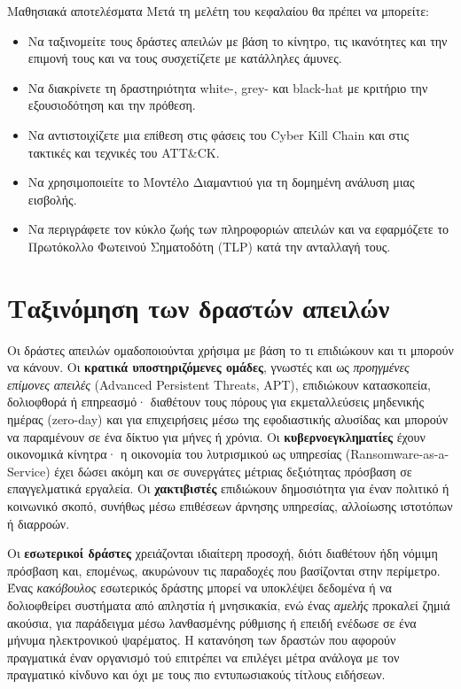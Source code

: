 \documentclass[11pt,openany]{book}
\begin{document}
\begin{outcomesbox}{Μαθησιακά αποτελέσματα}
Μετά τη μελέτη του κεφαλαίου θα πρέπει να μπορείτε:
\begin{itemize}
  \item Να ταξινομείτε τους δράστες απειλών με βάση το κίνητρο, τις ικανότητες και την επιμονή τους και να τους συσχετίζετε με κατάλληλες άμυνες.
  \item Να διακρίνετε τη δραστηριότητα white-, grey- και black-hat με κριτήριο την εξουσιοδότηση και την πρόθεση.
  \item Να αντιστοιχίζετε μια επίθεση στις φάσεις του Cyber Kill Chain και στις τακτικές και τεχνικές του ATT\&CK.
  \item Να χρησιμοποιείτε το Μοντέλο Διαμαντιού για τη δομημένη ανάλυση μιας εισβολής.
  \item Να περιγράφετε τον κύκλο ζωής των πληροφοριών απειλών και να εφαρμόζετε το Πρωτόκολλο Φωτεινού Σηματοδότη (TLP) κατά την ανταλλαγή τους.
\end{itemize}
\end{outcomesbox}

\section{Ταξινόμηση των δραστών απειλών}\label{sec:3.1}
Οι δράστες απειλών ομαδοποιούνται χρήσιμα με βάση το τι επιδιώκουν και τι μπορούν να κάνουν. Οι \textbf{κρατικά υποστηριζόμενες ομάδες}, γνωστές και ως \emph{προηγμένες επίμονες απειλές} (Advanced Persistent Threats, APT), επιδιώκουν κατασκοπεία, δολιοφθορά ή επηρεασμό· διαθέτουν τους πόρους για εκμεταλλεύσεις μηδενικής ημέρας (zero-day) και για επιχειρήσεις μέσω της εφοδιαστικής αλυσίδας και μπορούν να παραμένουν σε ένα δίκτυο για μήνες ή χρόνια. Οι \textbf{κυβερνοεγκληματίες} έχουν οικονομικά κίνητρα· η οικονομία του λυτρισμικού ως υπηρεσίας (Ransomware-as-a-Service) έχει δώσει ακόμη και σε συνεργάτες μέτριας δεξιότητας πρόσβαση σε επαγγελματικά εργαλεία. Οι \textbf{χακτιβιστές} επιδιώκουν δημοσιότητα για έναν πολιτικό ή κοινωνικό σκοπό, συνήθως μέσω επιθέσεων άρνησης υπηρεσίας, αλλοίωσης ιστοτόπων ή διαρροών.

Οι \textbf{εσωτερικοί δράστες} χρειάζονται ιδιαίτερη προσοχή, διότι διαθέτουν ήδη νόμιμη πρόσβαση και, επομένως, ακυρώνουν τις παραδοχές που βασίζονται στην περίμετρο. Ένας \emph{κακόβουλος} εσωτερικός δράστης μπορεί να υποκλέψει δεδομένα ή να δολιοφθείρει συστήματα από απληστία ή μνησικακία, ενώ ένας \emph{αμελής} προκαλεί ζημιά ακούσια, για παράδειγμα μέσω λανθασμένης ρύθμισης ή επειδή ενέδωσε σε ένα μήνυμα ηλεκτρονικού ψαρέματος. Η κατανόηση των δραστών που αφορούν πραγματικά έναν οργανισμό τού επιτρέπει να επιλέγει μέτρα ανάλογα με τον πραγματικό κίνδυνο και όχι με τους πιο εντυπωσιακούς τίτλους ειδήσεων.
\end{document}

